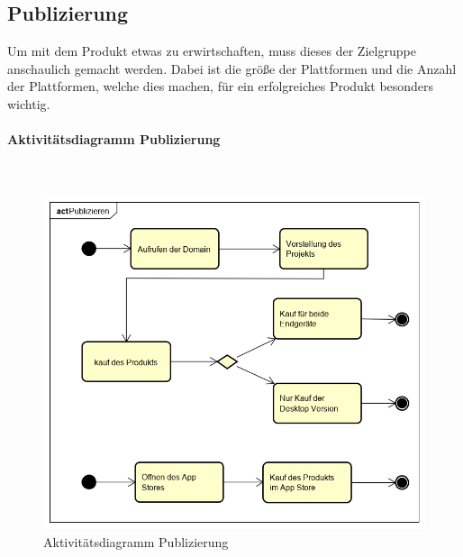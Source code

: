 \subsection{Publizierung}
Um mit dem Produkt etwas zu erwirtschaften, muss dieses der Zielgruppe anschaulich gemacht werden. Dabei ist die größe der Plattformen und die Anzahl der Plattformen, welche dies machen, für ein erfolgreiches Produkt besonders wichtig.
\paragraph{Aktivitätsdiagramm Publizierung}\mbox{}\\
\begin{figure}[H]
	\centering
	\includegraphics[width= 0.9\linewidth]{diagramms/activity/Publizieren.png}
	\caption{Aktivitätsdiagramm Publizierung}
\end{figure}
\newpage
